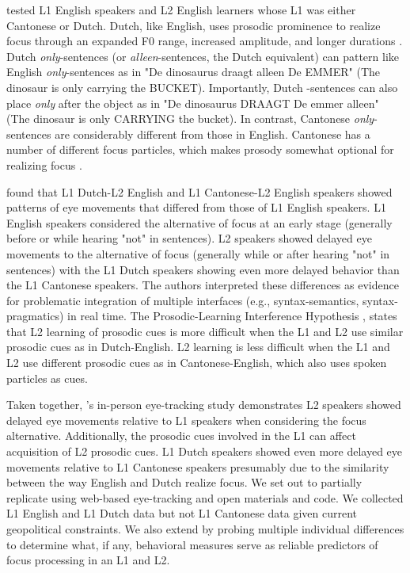 \cite{Ge2021} tested L1 English speakers and L2 English learners whose L1 was either Cantonese or Dutch. Dutch, like English, uses prosodic prominence to realize focus through an expanded F0 range, increased amplitude, and longer durations \citep{dimitrova2010focus}. Dutch \textit{only}-sentences (or \textit{alleen}-sentences, the Dutch equivalent) can pattern like English \textit{only}-sentences as in "De dinosaurus draagt alleen De EMMER" (The dinosaur is only carrying the BUCKET). Importantly, Dutch -sentences can also place \textit{only} after the object as in "De dinosaurus DRAAGT De emmer alleen" (The dinosaur is only CARRYING the bucket). In contrast, Cantonese \textit{only}-sentences are considerably different from those in English. Cantonese has a number of different focus particles, which makes prosody somewhat optional for realizing focus \citep{lee2019focus, wu2010prosodic, ge2024bilingual, fung2000final}. 

\cite{Ge2021} found that L1 Dutch-L2 English and L1 Cantonese-L2 English speakers showed patterns of eye movements that differed from those of L1 English speakers. L1 English speakers considered the alternative of focus at an early stage (generally before or while hearing "not" in sentences). L2 speakers showed delayed eye movements to the alternative of focus (generally while or after hearing "not" in sentences) with the L1 Dutch speakers showing even more delayed behavior than the L1 Cantonese speakers. The authors interpreted these differences as evidence for problematic integration of multiple interfaces (e.g., syntax-semantics, syntax-pragmatics) in real time. The Prosodic-Learning Interference Hypothesis \citep{tremblay2016effects, tremblay2021re}, states that L2 learning of prosodic cues is more difficult when the L1 and L2 use similar prosodic cues as in Dutch-English. L2 learning is less difficult when the L1 and L2 use different prosodic cues as in Cantonese-English, which also uses spoken particles as cues.

Taken together, \cite{Ge2021}'s in-person eye-tracking study demonstrates L2 speakers showed delayed eye movements relative to L1 speakers when considering the focus alternative. Additionally, the prosodic cues involved in the L1 can affect acquisition of L2 prosodic cues. L1 Dutch speakers showed even more delayed eye movements relative to L1 Cantonese speakers presumably due to the similarity between the way English and Dutch realize focus. We set out to partially replicate \cite{Ge2021} using web-based eye-tracking and open materials and code. We collected L1 English and L1 Dutch data but not L1 Cantonese data given current geopolitical constraints. We also extend \cite{Ge2021} by probing multiple individual differences to determine what, if any, behavioral measures serve as reliable predictors of focus processing in an L1 and L2. 

